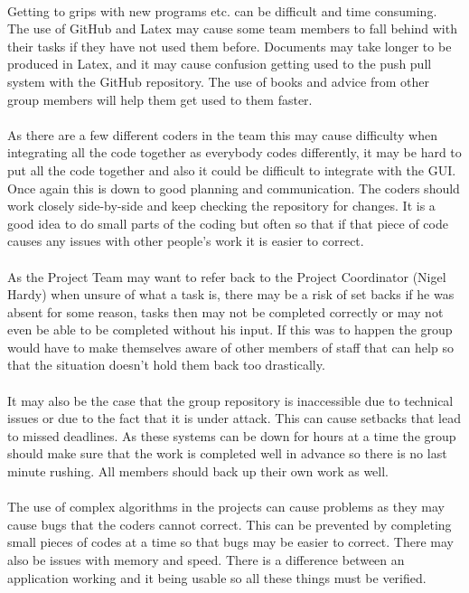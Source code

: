 \documentclass[titlepage]{article}
\begin{document}
\paragraph{}Getting to grips with new programs etc. can be difficult and time consuming. The use of GitHub and Latex may cause some team members to fall behind with their tasks if they have not used them before. Documents may take longer to be produced in Latex, and it may cause confusion getting used to the push pull system with the GitHub repository. The use of books and advice from other group members will help them get used to them faster.
\paragraph{}As there are a few different coders in the team this may cause difficulty when integrating all the code together as everybody codes differently, it may be hard to put all the code together and also it could be difficult to integrate with the GUI. Once again this is down to good planning and communication. The coders should work closely side-by-side and keep checking the repository for changes. It is a good idea to do small parts of the coding but often so that if that piece of code causes any issues with other people's work it is easier to correct.
\paragraph{}As the Project Team may want to refer back to the Project Coordinator (Nigel Hardy) when unsure of what a task is, there may be a risk of set backs if he was absent for some reason, tasks then may not be completed correctly or may not even be able to be completed without his input. If this was to happen the group would have to make themselves aware of other members of staff that can help so that the situation doesn't hold them back too drastically.
\paragraph{}It may also be the case that the group repository is inaccessible due to technical issues or due to the fact that it is under attack. This can cause setbacks that lead to missed deadlines. As these systems can be down for hours at a time the group should make sure that the work is completed well in advance so there is no last minute rushing. All members should back up their own work as well.
\paragraph{}The use of complex algorithms in the projects can cause problems as they may cause bugs that the coders cannot correct. This can be prevented by completing small pieces of codes at a time so that bugs may be easier to correct. There may also be issues with memory and speed. There is a difference between an application working and it being usable so all these things must be verified.
\end{document}

